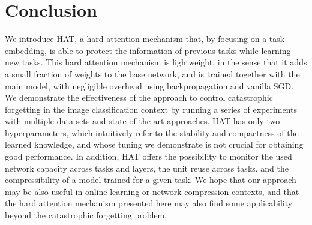 \section{Conclusion}
\label{sec:Conclusion}

We introduce HAT, a hard attention mechanism that, by focusing on a task embedding, is able to protect the information of previous tasks while learning new tasks. This hard attention mechanism is lightweight, in the sense that it adds a small fraction of weights to the base network, and is trained together with the main model, with negligible overhead using backpropagation and vanilla SGD. We demonstrate the effectiveness of the approach to control catastrophic forgetting in the image classification context by running a series of experiments with multiple data sets and state-of-the-art approaches. HAT has only two hyperparameters, which intuitively refer to the stability and compactness of the learned knowledge, and whose tuning we demonstrate is not crucial for obtaining good performance. In addition, HAT offers the possibility to monitor the used network capacity across tasks and layers, the unit reuse across tasks, and the compressibility of a model trained for a given task. We hope that our approach may be also useful in online learning or network compression contexts, and that the hard attention mechanism presented here may also find some applicability beyond the catastrophic forgetting problem.









\balance


